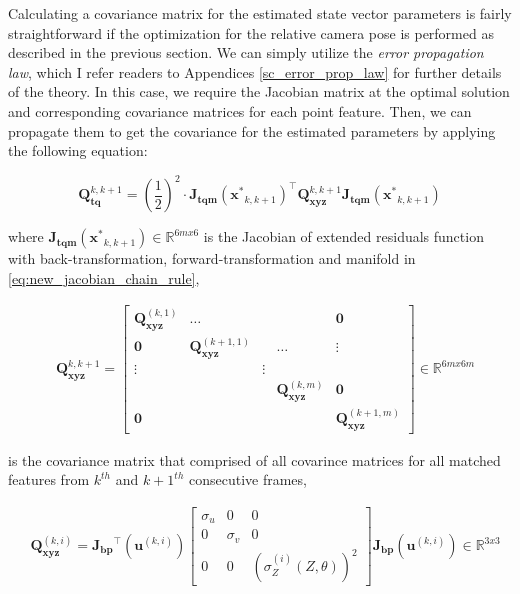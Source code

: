 \documentclass[12pt]{report}
\numberwithin{figure}{section}
\newcommand{\R}{\mathbb{R}}
\begin{document}
Calculating a covariance matrix for the estimated state vector parameters is
fairly straightforward if the optimization for the relative camera pose is
performed as described in the previous section. We can simply utilize the
\textit{error propagation law}, which I refer readers to Appendices
\ref{sc_error_prop_law} for further details of the theory.  In this case, we
require the Jacobian matrix at the optimal solution and corresponding
covariance  matrices for each point feature. Then, we can propagate them to get
the covariance for the estimated parameters by applying the following equation:

\begin{equation}\label{eq:cov_tq_prop} \mathbf{Q}_{\mathbf{tq}}^{k,k+1} =
(\frac{1}{2})^2 \cdot \mathbf{J_{tqm}}(\mathbf{x^*}_{k,k+1})^\top
\mathbf{Q}_{\mathbf{xyz}}^{k,k+1} \mathbf{J_{tqm}}(\mathbf{x^*}_{k,k+1})
\end{equation}

where $\mathbf{J_{tqm}}(\mathbf{x^*}_{k,k+1}) \in \R^{6mx6}$ is the Jacobian of
extended residuals function with back-transformation, forward-transformation 
and manifold
in \eqref{eq:new_jacobian_chain_rule},

\begin{equation} \begin{aligned} & \mathbf{Q}_{\mathbf{xyz}}^{k,k+1}  =
\begin{bmatrix} \mathbf{Q}_{\mathbf{xyz}}^{(k,1)} & \dots & & &\mathbf{0} \\
\mathbf{0} & \mathbf{Q}_{\mathbf{xyz}}^{(k+1,1)} & &\dots & \vdots  \\ \vdots &
& \vdots &  &\\ &  & & \mathbf{Q}_{\mathbf{xyz}}^{(k,m)} & \mathbf{0} \\
\mathbf{0} &  & & & \mathbf{Q}_{\mathbf{xyz}}^{(k+1,m)} \end{bmatrix} \in
\R^{6mx6m} \end{aligned} \end{equation}

is the covariance matrix that comprised of all covarince matrices for all
matched features from $k^{th}$ and $k+1^{th}$ consecutive frames,

\begin{equation}\label{eq:cov_xyz_prop} \begin{aligned} &
\mathbf{Q}_{\mathbf{xyz}}^{(k,i)} = 
\mathbf{J_{bp}}^\top(\mathbf{u}^{(k,i)})
\begin{bmatrix} \sigma_u & 0 & 0 \\ 0 & \sigma_v & 0 \\ 0 & 0 &
(\sigma_Z^{(i)}(Z, \theta))^2 \end{bmatrix} \mathbf{J_{bp}}(\mathbf{u}^{(k,i)})
\in \R^{3x3} \end{aligned} \end{equation}
\end{document}
